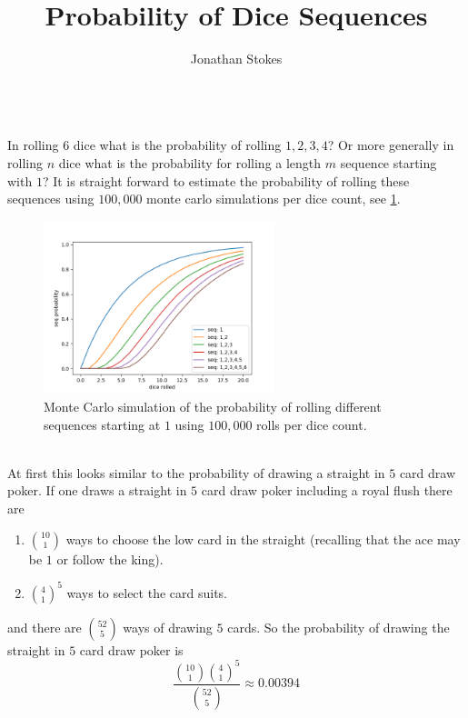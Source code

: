 \documentclass[12pt,a4paper]{article}
\title{Probability of Dice Sequences}
\author{Jonathan Stokes}
\begin{document}
\maketitle

\hrulefill\\

In rolling $6$ dice what is the probability of rolling $1,2,3,4$? Or more generally in rolling $n$ dice what is the probability for rolling a length $m$ sequence starting with $1$?
It is straight forward to estimate the probability of rolling these sequences using $100,000$ monte carlo simulations per dice count, see \cref{fig:monte_carlo_sim}.\\

\begin{figure}[H]
    \centering
    \includegraphics[width=0.6\textwidth]{figs/monte_carlo_seq_prob.png}
    \caption{Monte Carlo simulation of the probability of rolling different sequences starting at $1$ using $100,000$ rolls per dice count.}
    \label{fig:monte_carlo_sim}
\end{figure}

\hrulefill\\

At first this looks similar to the probability of drawing a straight in $5$ card draw poker. If one draws a straight in $5$ card draw poker including a royal flush there are 

\begin{enumerate}
\item $\binom{10}{1}$ ways to choose the low card in the straight (recalling that the ace may be $1$ or follow the king). 
\item $\binom{4}{1}^5$ ways to select the card suits.
\end{enumerate}
and there are $\binom{52}{5}$ ways of drawing $5$ cards. So the probability of drawing the straight in $5$ card draw poker is
\begin{equation}
\frac{\binom{10}{1}\binom{4}{1}^5}{\binom{52}{5}} \approx 0.00394
\end{equation}
\end{document}
